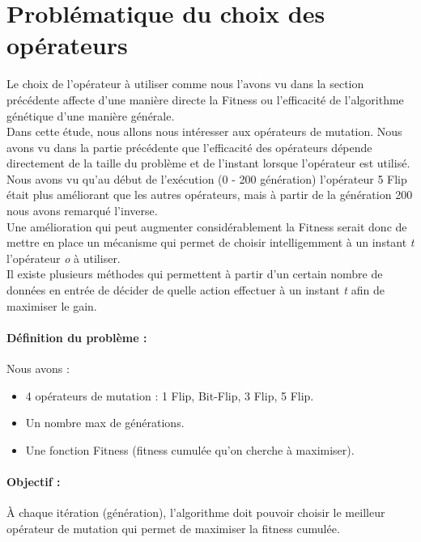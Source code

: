 \documentclass[12pt]{article}
\begin{document}

\section{Problématique du choix des opérateurs}
Le choix de l'opérateur à utiliser comme nous l'avons vu dans la section précédente affecte d'une manière directe la Fitness ou l'efficacité de l'algorithme génétique d'une manière générale.\\

Dans cette étude, nous allons nous intéresser aux opérateurs de mutation. Nous avons vu dans la partie précédente que l'efficacité des opérateurs dépende directement de la taille du problème et de l'instant lorsque l'opérateur est utilisé. Nous avons vu qu'au début de l'exécution (0 - 200 génération) l'opérateur 5 Flip était plus améliorant que les autres opérateurs, mais à partir de la génération 200 nous avons remarqué l'inverse.\\

Une amélioration qui peut augmenter considérablement la Fitness serait donc de mettre en place un mécanisme qui permet de choisir intelligemment à un instant \textit{t} l'opérateur \textit{o} à utiliser.\\

Il existe plusieurs méthodes qui permettent à partir d'un certain nombre de données en entrée de décider de quelle action effectuer à un instant \textit{t} afin de maximiser le gain.

\paragraph{Définition du problème :} Nous avons :
\begin{itemize}[label=-]
\item 4 opérateurs de mutation : 1 Flip, Bit-Flip, 3 Flip, 5 Flip. 
\item Un nombre max de générations.
\item Une fonction Fitness (fitness cumulée qu'on cherche à maximiser).
\end{itemize}
\paragraph{Objectif : } À chaque itération (génération), l'algorithme doit pouvoir choisir le meilleur opérateur de mutation qui permet de maximiser la fitness cumulée. 
\end{document}
